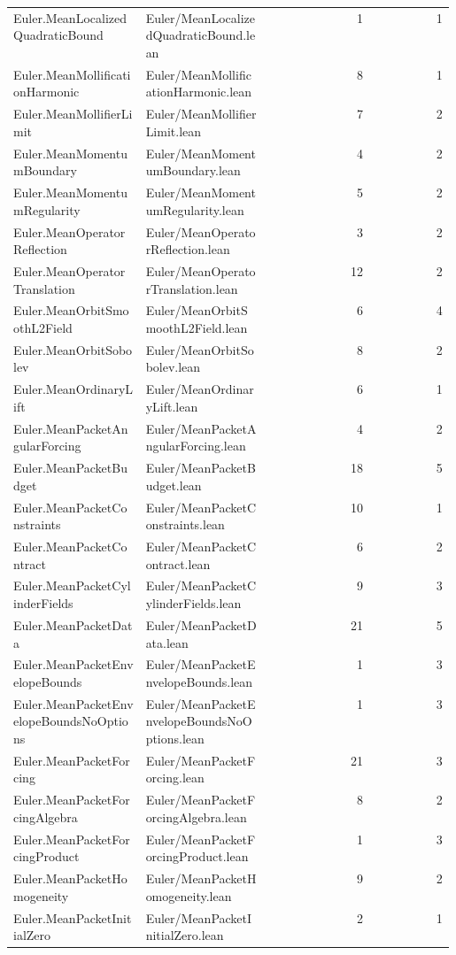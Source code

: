 \begin{longtable}{p{0.30\linewidth}p{0.28\linewidth}rr}
Euler.MeanLocalizedQuadraticBound & Euler/MeanLocalizedQuadraticBound.lean & 1 & 1\\
Euler.MeanMollificationHarmonic & Euler/MeanMollificationHarmonic.lean & 8 & 1\\
Euler.MeanMollifierLimit & Euler/MeanMollifierLimit.lean & 7 & 2\\
Euler.MeanMomentumBoundary & Euler/MeanMomentumBoundary.lean & 4 & 2\\
Euler.MeanMomentumRegularity & Euler/MeanMomentumRegularity.lean & 5 & 2\\
Euler.MeanOperatorReflection & Euler/MeanOperatorReflection.lean & 3 & 2\\
Euler.MeanOperatorTranslation & Euler/MeanOperatorTranslation.lean & 12 & 2\\
Euler.MeanOrbitSmoothL2Field & Euler/MeanOrbitSmoothL2Field.lean & 6 & 4\\
Euler.MeanOrbitSobolev & Euler/MeanOrbitSobolev.lean & 8 & 2\\
Euler.MeanOrdinaryLift & Euler/MeanOrdinaryLift.lean & 6 & 1\\
Euler.MeanPacketAngularForcing & Euler/MeanPacketAngularForcing.lean & 4 & 2\\
Euler.MeanPacketBudget & Euler/MeanPacketBudget.lean & 18 & 5\\
Euler.MeanPacketConstraints & Euler/MeanPacketConstraints.lean & 10 & 1\\
Euler.MeanPacketContract & Euler/MeanPacketContract.lean & 6 & 2\\
Euler.MeanPacketCylinderFields & Euler/MeanPacketCylinderFields.lean & 9 & 3\\
Euler.MeanPacketData & Euler/MeanPacketData.lean & 21 & 5\\
Euler.MeanPacketEnvelopeBounds & Euler/MeanPacketEnvelopeBounds.lean & 1 & 3\\
Euler.MeanPacketEnvelopeBoundsNoOptions & Euler/MeanPacketEnvelopeBoundsNoOptions.lean & 1 & 3\\
Euler.MeanPacketForcing & Euler/MeanPacketForcing.lean & 21 & 3\\
Euler.MeanPacketForcingAlgebra & Euler/MeanPacketForcingAlgebra.lean & 8 & 2\\
Euler.MeanPacketForcingProduct & Euler/MeanPacketForcingProduct.lean & 1 & 3\\
Euler.MeanPacketHomogeneity & Euler/MeanPacketHomogeneity.lean & 9 & 2\\
Euler.MeanPacketInitialZero & Euler/MeanPacketInitialZero.lean & 2 & 1\\

\end{longtable}
